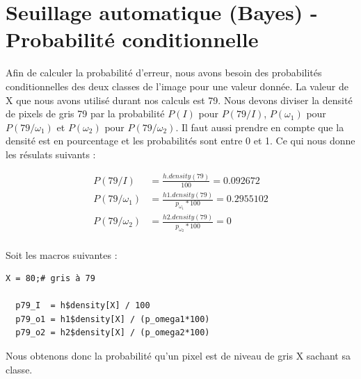 \documentclass[a4paper,11pt]{article}
\begin{document}
  \section{Seuillage automatique (Bayes) - Probabilité conditionnelle}
  Afin de calculer la probabilité d'erreur, nous avons besoin des probabilités conditionnelles des deux
  classes de l'image pour une valeur donnée. La valeur de X que nous avons utilisé durant nos calculs
  est 79. Nous devons diviser la densité de pixels de gris 79 par la probabilité $P(I)$ pour $P(79/I)$, 
  $P(\omega_1)$ pour $P(79/\omega_1)$ et $P(\omega_2)$ pour $P(79/\omega_2)$. Il faut aussi prendre en compte
  que la densité est en pourcentage et les probabilités sont entre 0 et 1. Ce qui nous donne les résulats suivants :
  
  \begin{align*}
    P(79/I) &= \frac{h.density(79)}{100} = 0.092672 \\
    P(79/\omega_1) &= \frac{ h1.density(79) }{ p_{\omega_{1}}*100 } = 0.2955102 \\
    P(79/\omega_2) &= \frac{ h2.density(79) }{ p_{\omega_{2}}*100 } = 0 \\
  \end{align*}
  
  
  
  Soit les macros suivantes : \\
  
  \begin{lstlisting}[caption=Macros de calcule de probabilités conditionnelles]
  X = 80;# gris à 79

  p79_I  = h$density[X] / 100
  p79_o1 = h1$density[X] / (p_omega1*100)
  p79_o2 = h2$density[X] / (p_omega2*100)\end{lstlisting}
  
  Nous obtenons donc la probabilité qu'un pixel est de niveau de gris X sachant sa classe.
  
\end{document}
